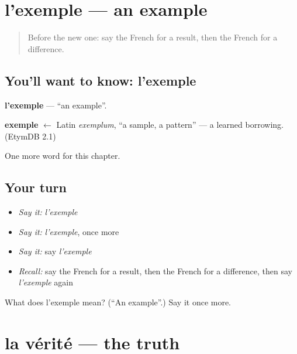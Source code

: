 \section[l'exemple]{l'exemple — an example}

\label{lesson:FR-C251-exemple}



\begin{quote}
Before the new one: say the French for a result, then the French for a difference.
\end{quote}

\subsection*{You'll want to know: l'exemple}
\textbf{l'exemple} — \textquotedblleft{}an example\textquotedblright{}.

\begin{cousinweb}
\textbf{exemple} $\leftarrow$ Latin \emph{exemplum}, \textquotedblleft{}a sample, a pattern\textquotedblright{} — a learned borrowing. (EtymDB 2.1)
\end{cousinweb}

\begin{grammarlens}[title={What you've built}]
One more word for this chapter.
\end{grammarlens}

\subsection*{Your turn}
\begin{itemize}
\raggedright
  \item \emph{Say it:} \emph{l'exemple}
  \item \emph{Say it:} \emph{l'exemple}, once more
  \item \emph{Say it:} say \emph{l'exemple}
  \item \emph{Recall:} say the French for a result, then the French for a difference, then say \emph{l'exemple} again
\end{itemize}

\begin{tcolorbox}[breakable,colback=teal!4,colframe=teal!35!black,title={Before you move on}]
What does l'exemple mean? (\textquotedblleft{}An example\textquotedblright{}.) Say it once more.
\end{tcolorbox}
\section[la vérité]{la vérité — the truth}

